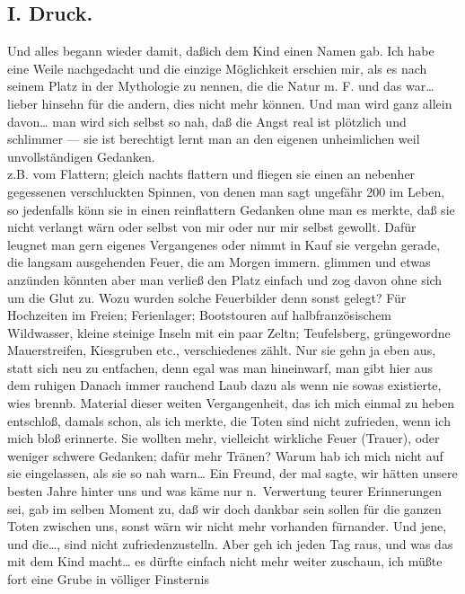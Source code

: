 \documentclass[
]{article}
\author{}
\date{\vspace{-2.5em}}
\begin{document}
\subsection{I. Druck.}\label{i.-druck.}

Und alles begann wieder damit, daßich dem Kind einen Namen gab. Ich habe
eine Weile nachgedacht und die einzige Möglichkeit erschien mir, als es
nach seinem Platz in der Mythologie zu nennen, die die Natur m. F. und
das war\ldots{} lieber hinsehn für die andern, dies nicht mehr können.
Und man wird ganz allein davon\ldots{} man wird sich selbst so nah, daß
die Angst real ist plötzlich und schlimmer --- sie ist berechtigt lernt
man an den eigenen unheimlichen weil unvollständigen Gedanken.\\
z.B. vom Flattern; gleich nachts flattern und fliegen sie einen an
nebenher gegessenen verschluckten Spinnen, von denen man sagt ungefähr
200 im Leben, so jedenfalls könn sie in einen reinflattern Gedanken ohne
man es merkte, daß sie nicht verlangt wärn oder selbst von mir oder nur
mir selbst gewollt. Dafür leugnet man gern eigenes Vergangenes oder
nimmt in Kauf sie vergehn gerade, die langsam ausgehenden Feuer, die am
Morgen immern. glimmen und etwas anzünden könnten aber man verließ den
Platz einfach und zog davon ohne sich um die Glut zu. Wozu wurden solche
Feuerbilder denn sonst gelegt? Für Hochzeiten im Freien; Ferienlager;
Bootstouren auf halbfranzösischem Wildwasser, kleine steinige Inseln mit
ein paar Zeltn; Teufelsberg, grüngewordne Mauerstreifen, Kiesgruben
etc., verschiedenes zählt. Nur sie gehn ja eben aus, statt sich neu zu
entfachen, denn egal was man hineinwarf, man gibt hier aus dem ruhigen
Danach immer rauchend Laub dazu als wenn nie sowas existierte, wies
brennb. Material dieser weiten Vergangenheit, das ich mich einmal zu
heben entschloß, damals schon, als ich merkte, die Toten sind nicht
zufrieden, wenn ich mich bloß erinnerte. Sie wollten mehr, vielleicht
wirkliche Feuer (Trauer), oder weniger schwere Gedanken; dafür mehr
Tränen? Warum hab ich mich nicht auf sie eingelassen, als sie so nah
warn\ldots{} Ein Freund, der mal sagte, wir hätten unsere besten Jahre
hinter uns und was käme nur n.~Verwertung teurer Erinnerungen sei, gab
im selben Moment zu, daß wir doch dankbar sein sollen für die ganzen
Toten zwischen uns, sonst wärn wir nicht mehr vorhanden fürnander. Und
jene, und die\ldots, sind nicht zufriedenzustelln. Aber geh ich jeden
Tag raus, und was das mit dem Kind macht\ldots{} es dürfte einfach nicht
mehr weiter zuschaun, ich müßte fort eine Grube in völliger Finsternis
\end{document}
